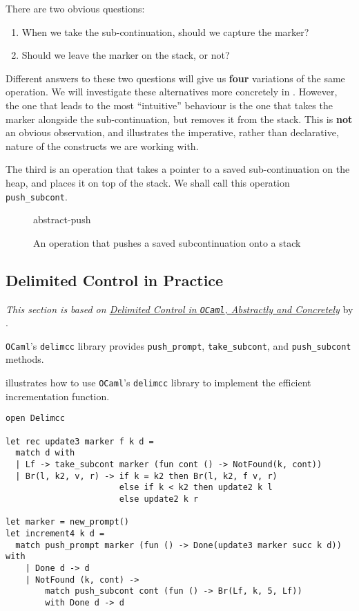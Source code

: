 There are two obvious questions: 
\begin{enumerate}
    \item When we take the sub-continuation, should we capture the marker?
    \item Should we leave the marker on the stack, or not?
\end{enumerate}

Different answers to these two questions will give us \textbf{four} variations of the same operation. We will investigate these alternatives more concretely in . However, the one that leads to the most ``intuitive'' behaviour is the one that takes the marker alongside the sub-continuation, but removes it from the stack. This is \textbf{not} an obvious observation, and illustrates the imperative, rather than declarative, nature of the constructs we are working with.

The third is an operation that takes a pointer to a saved sub-continuation on the heap, and places it on top of the stack. We shall call this operation \texttt{push\_subcont}. 

\begin{figure}[H]
    \centering
    {abstract-push}
    \caption{An operation that pushes a saved subcontinuation onto a stack}
    \label{fig:abstract-pushsubcont}
\end{figure}

\subsection{Delimited Control in Practice}
\textit{This section is based on \href{https://www.sciencedirect.com/science/article/pii/S0304397512001661}{Delimited Control in \texttt{OCaml}, Abstractly and Concretely}} by \citet{kisyelov-2014}.

\texttt{OCaml}'s \texttt{delimcc} library provides \texttt{push\_prompt}, \texttt{take\_subcont}, and \texttt{push\_subcont} methods.

 illustrates how to use \texttt{OCaml}'s \texttt{delimcc} library to implement the efficient incrementation function. 

\begin{code}
\label{code:efficient-incrementation-delimcc}
\begin{verbatim}
open Delimcc

let rec update3 marker f k d =
  match d with
  | Lf -> take_subcont marker (fun cont () -> NotFound(k, cont))
  | Br(l, k2, v, r) -> if k = k2 then Br(l, k2, f v, r)
                       else if k < k2 then update2 k l
                       else update2 k r

let marker = new_prompt()
let increment4 k d = 
  match push_prompt marker (fun () -> Done(update3 marker succ k d)) with
    | Done d -> d
    | NotFound (k, cont) ->
        match push_subcont cont (fun () -> Br(Lf, k, 5, Lf)) 
        with Done d -> d
\end{verbatim}
\end{code}

